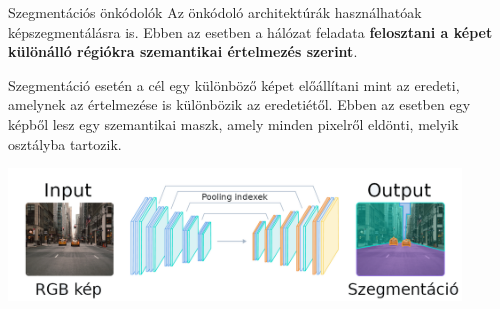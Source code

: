\documentclass[english, aspectratio=169]{beamer}
\begin{document}
\begin{frame}{Szegmentációs önkódolók}
Az önkódoló architektúrák használhatóak képszegmentálásra is. Ebben az esetben a hálózat feladata \textbf{felosztani a képet különálló régiókra szemantikai értelmezés szerint}.\par\smallskip Szegmentáció esetén a cél egy különböző képet előállítani mint az eredeti, amelynek az értelmezése is különbözik az eredetiétől. Ebben az esetben egy képből lesz egy szemantikai maszk, amely minden pixelről eldönti, melyik osztályba tartozik. 
\begin{center}
\includegraphics[width=12cm, keepaspectratio]{images/dl_11.png}
\end{center} 
\end{frame}
\end{document}
